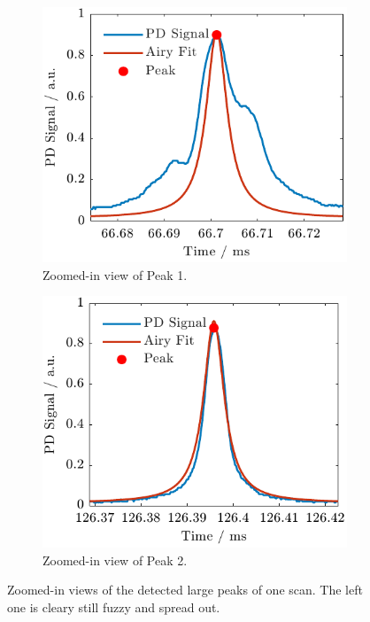 \documentclass[a4paper,11pt]{article}
\begin{document}
\begin{figure}[H]
    \centering
    \begin{subfigure}[t]{0.48\textwidth}
        \centering
        \includegraphics[width=\textwidth]{twoPiezo/Figure_31.pdf}
        \caption{Zoomed-in view of Peak 1.}
        \label{fig:peak1_low}
    \end{subfigure}
    \hfill
    \begin{subfigure}[t]{0.48\textwidth}
        \centering
        \includegraphics[width=\textwidth]{twoPiezo/Figure_41.pdf}
        \caption{Zoomed-in view of Peak 2.}
        \label{fig:peak2_low}
    \end{subfigure}
    \caption{Zoomed-in views of the detected large peaks of one scan. The left one is cleary still fuzzy and spread out.}
\end{figure}
\end{document}

